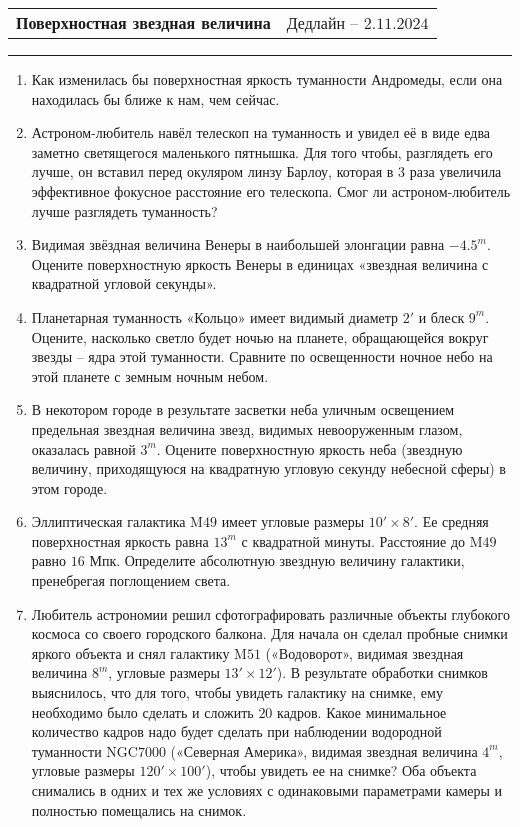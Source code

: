 \documentclass[12pt]{article}
\begin{document}
 \begin{tabularx}{\textwidth}{Xr}
  {\Large \textbf{Поверхностная звездная величина}} & Дедлайн -- $2.11.2024$ \\
 \end{tabularx}
 \noindent\rule{\textwidth}{0.4pt}
 \begin{enumerate}
        \item Как изменилась бы поверхностная яркость туманности Андромеды, если она находилась бы ближе к нам, чем сейчас.
        \item Астроном-любитель навёл телескоп на туманность и увидел её в виде едва заметно светящегося маленького пятнышка. Для того чтобы, разглядеть его лучше, он вставил перед окуляром линзу Барлоу, которая в $3$ раза увеличила эффективное фокусное расстояние его телескопа. Смог ли астроном-любитель лучше разглядеть туманность?
        \item Видимая звёздная величина Венеры в наибольшей элонгации равна $-4.5^m$. Оцените поверхностную яркость Венеры в единицах «звездная величина с квадратной угловой секунды».
        \item Планетарная туманность «Кольцо» имеет видимый диаметр $2'$ и блеск $9^m$. Оцените, насколько светло будет ночью на планете, обращающейся вокруг звезды –
        ядра этой туманности. Сравните по освещенности ночное небо на этой планете с земным ночным небом.
        \item  В некотором городе в результате засветки неба уличным освещением предельная звездная величина звезд, видимых невооруженным глазом, оказалась равной $3^m$. Оцените поверхностную яркость неба (звездную величину, приходящуюся на квадратную угловую секунду небесной сферы) в этом городе.
        \item Эллиптическая галактика M$49$ имеет угловые размеры $10'\times8'$. Ее средняя поверхностная яркость равна $13^m$ с квадратной минуты. Расстояние до M$49$ равно $16$ Мпк. Определите абсолютную звездную величину галактики, пренебрегая поглощением света.
        \item Любитель астрономии решил сфотографировать различные объекты глубокого космоса со своего городского балкона. Для начала он сделал пробные снимки яркого объекта и снял галактику M$51$ («Водоворот», видимая звездная величина $8^m$, угловые размеры $13'\times12'$). В результате обработки снимков выяснилось, что для того, чтобы увидеть галактику на снимке, ему необходимо было сделать и сложить $20$ кадров. Какое минимальное количество кадров надо будет сделать при наблюдении водородной туманности NGC$7000$ («Северная Америка», видимая звездная величина $4^m$, угловые размеры $120'\times100'$), чтобы увидеть ее на снимке? Оба объекта снимались в одних и тех же условиях с одинаковыми параметрами камеры и полностью помещались на снимок.
 \end{enumerate}
\end{document}
